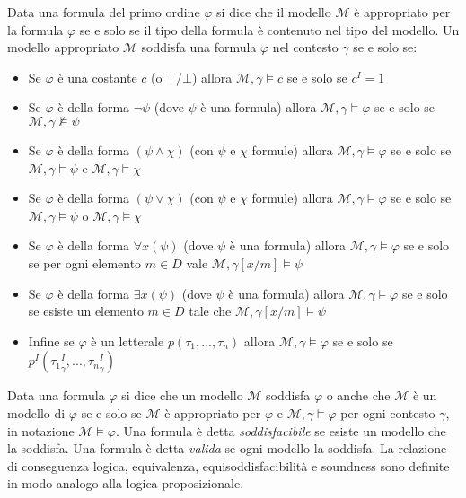 \documentclass[./main.tex]{subfiles}
\begin{document}
Data una formula del primo ordine $\varphi$ si dice che il modello $\mathcal{M}$ è appropriato per la formula $\varphi$ se e solo se il tipo della formula è contenuto nel tipo del modello.
Un modello appropriato $\mathcal{M}$ soddisfa una formula $\varphi$ nel contesto $\gamma$ se e solo se:
\begin{itemize}
  \item Se $\varphi$ è una costante $c$ (o $\top$/$\bot$) allora $\mathcal{M}, \gamma \models c$ se e solo se $c^I = 1$
  \item Se $\varphi$ è della forma $\lnot \psi$ (dove $\psi$ è una formula) allora $\mathcal{M}, \gamma \models \varphi$ se e solo se $\mathcal{M}, \gamma \not\models \psi$
  \item Se $\varphi$ è della forma $(\psi \land \chi)$ (con $\psi$ e $\chi$ formule) allora $\mathcal{M}, \gamma \models \varphi$ se e solo se $\mathcal{M}, \gamma \models \psi$ e $\mathcal{M}, \gamma \models \chi$
  \item Se $\varphi$ è della forma $(\psi \lor \chi)$ (con $\psi$ e $\chi$ formule) allora $\mathcal{M}, \gamma \models \varphi$ se e solo se $\mathcal{M}, \gamma \models \psi$ o $\mathcal{M}, \gamma \models \chi$
  \item Se $\varphi$ è della forma $\forall x (\psi)$ (dove $\psi$ è una formula) allora $\mathcal{M}, \gamma \models \varphi$
   se e solo se per ogni elemento $m \in D$ vale $\mathcal{M}, \gamma[x/m] \models \psi$
  \item Se $\varphi$ è della forma $\exists x (\psi)$ (dove $\psi$ è una formula) allora $\mathcal{M}, \gamma \models \varphi$ se e solo se
    esiste un elemento $m \in D$ tale che $\mathcal{M}, \gamma[x/m] \models \psi$
  \item Infine se $\varphi$ è un letterale $p(\tau_1, ..., \tau_n)$ allora $\mathcal{M}, \gamma \models \varphi$ se e solo se $p^I({\tau_1}^I_\gamma, ..., {\tau_n}^I_\gamma)$
\end{itemize}

Data una formula $\varphi$ si dice che un modello $\mathcal{M}$ soddisfa $\varphi$ o anche che $\mathcal{M}$ 
è un modello di $\varphi$ se e solo se $\mathcal{M}$ è appropriato per $\varphi$ e $\mathcal{M}, \gamma \models \varphi$ per ogni contesto $\gamma$,
in notazione $\mathcal{M} \models \varphi$. Una formula è detta \textit{soddisfacibile} se esiste un modello che la soddisfa.
Una formula è detta \textit{valida} se ogni modello la soddisfa.
La relazione di conseguenza logica, equivalenza, equisoddisfacibilità e soundness sono definite in modo analogo alla logica proposizionale.
\end{document}
